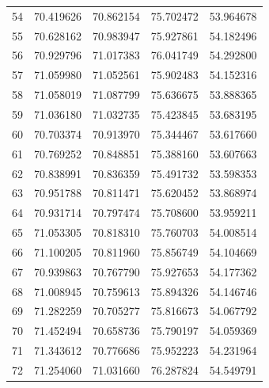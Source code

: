 \begin{table}
\begin{tabular}{rrrrr}
54 & 70.419626 & 70.862154 & 75.702472 & 53.964678 \\
55 & 70.628162 & 70.983947 & 75.927861 & 54.182496 \\
56 & 70.929796 & 71.017383 & 76.041749 & 54.292800 \\
57 & 71.059980 & 71.052561 & 75.902483 & 54.152316 \\
58 & 71.058019 & 71.087799 & 75.636675 & 53.888365 \\
59 & 71.036180 & 71.032735 & 75.423845 & 53.683195 \\
60 & 70.703374 & 70.913970 & 75.344467 & 53.617660 \\
61 & 70.769252 & 70.848851 & 75.388160 & 53.607663 \\
62 & 70.838991 & 70.836359 & 75.491732 & 53.598353 \\
63 & 70.951788 & 70.811471 & 75.620452 & 53.868974 \\
64 & 70.931714 & 70.797474 & 75.708600 & 53.959211 \\
65 & 71.053305 & 70.818310 & 75.760703 & 54.008514 \\
66 & 71.100205 & 70.811960 & 75.856749 & 54.104669 \\
67 & 70.939863 & 70.767790 & 75.927653 & 54.177362 \\
68 & 71.008945 & 70.759613 & 75.894326 & 54.146746 \\
69 & 71.282259 & 70.705277 & 75.816673 & 54.067792 \\
70 & 71.452494 & 70.658736 & 75.790197 & 54.059369 \\
71 & 71.343612 & 70.776686 & 75.952223 & 54.231964 \\
72 & 71.254060 & 71.031660 & 76.287824 & 54.549791 \\
\bottomrule
\end{tabular}
\end{table}
